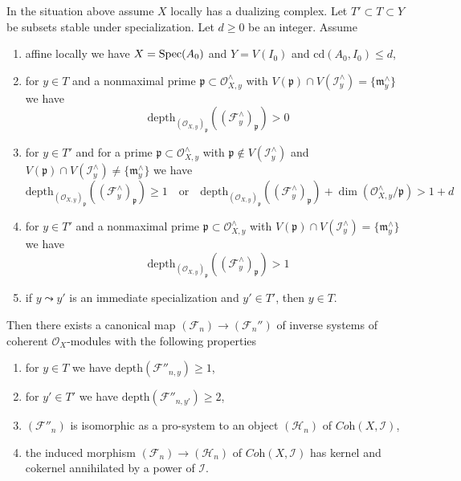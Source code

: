 \begin{lemma}
\label{lemma-improvement-formal-coherent-module-better}
In the situation above assume $X$ locally has a dualizing complex.
Let $T' \subset T \subset Y$ be subsets stable under specialization.
Let $d \geq 0$ be an integer. Assume
\begin{enumerate}
\item[(a)] affine locally we have $X = \mathop{\mathrm{Spec}}(A_0)$ and $Y = V(I_0)$
and $\text{cd}(A_0, I_0) \leq d$,
\item[(b)] for $y \in T$ and a nonmaximal prime
$\mathfrak p \subset \mathcal{O}_{X, y}^\wedge$ with
$V(\mathfrak p) \cap V(\mathcal{I}_y^\wedge) = \{\mathfrak m_y^\wedge\}$
we have
$$
\text{depth}_{(\mathcal{O}_{X, y})_\mathfrak p}
((\mathcal{F}^\wedge_y)_\mathfrak p) > 0
$$
\item[(c)] for $y \in T'$ and for a prime
$\mathfrak p \subset \mathcal{O}_{X, y}^\wedge$ with
$\mathfrak p \not \in V(\mathcal{I}_y^\wedge)$
and $V(\mathfrak p) \cap V(\mathcal{I}_y^\wedge) \not =
\{\mathfrak m_y^\wedge\}$ we have
$$
\text{depth}_{(\mathcal{O}_{X, y})_\mathfrak p}
((\mathcal{F}^\wedge_y)_\mathfrak p) \geq 1
\quad\text{or}\quad
\text{depth}_{(\mathcal{O}_{X, y})_\mathfrak p}
((\mathcal{F}^\wedge_y)_\mathfrak p) +
\dim(\mathcal{O}_{X, y}^\wedge/\mathfrak p) > 1 + d
$$
\item[(d)] for $y \in T'$ and a nonmaximal prime
$\mathfrak p \subset \mathcal{O}_{X, y}^\wedge$ with
$V(\mathfrak p) \cap V(\mathcal{I}_y^\wedge) = \{\mathfrak m_y^\wedge\}$
we have
$$
\text{depth}_{(\mathcal{O}_{X, y})_\mathfrak p}
((\mathcal{F}^\wedge_y)_\mathfrak p) > 1
$$
\item[(e)] if $y \leadsto y'$ is an immediate specialization and
$y' \in T'$, then $y \in T$.
\end{enumerate}
Then there exists a canonical map $(\mathcal{F}_n) \to (\mathcal{F}_n'')$
of inverse systems of coherent $\mathcal{O}_X$-modules
with the following properties
\begin{enumerate}
\item for $y \in T$ we have $\text{depth}(\mathcal{F}''_{n, y}) \geq 1$,
\item for $y' \in T'$ we have $\text{depth}(\mathcal{F}''_{n, y'}) \geq 2$,
\item $(\mathcal{F}''_n)$ is isomorphic as a pro-system to an object
$(\mathcal{H}_n)$ of $\textit{Coh}(X, \mathcal{I})$,
\item the induced morphism $(\mathcal{F}_n) \to (\mathcal{H}_n)$ of
$\textit{Coh}(X, \mathcal{I})$ has kernel and cokernel
annihilated by a power of $\mathcal{I}$.
\end{enumerate}
\end{lemma}

